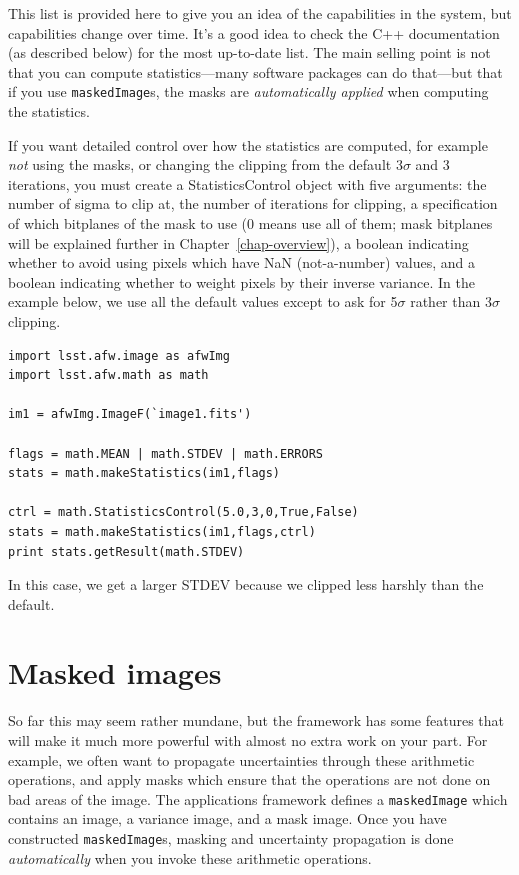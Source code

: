 This list is provided here to give you an idea of the capabilities in
the system, but capabilities change over time.  It's a good idea to
check the C++ documentation (as described below) for the most
up-to-date list.  The main selling point is not that you can compute
statistics---many software packages can do that---but that if you use
\texttt{maskedImage}s, the masks are {\it automatically applied} when
computing the statistics.

If you want detailed control over how the statistics are computed, for
example {\it not} using the masks, or changing the clipping from the
default 3$\sigma$ and 3 iterations, you must create a
StatisticsControl object with five arguments: the number of sigma to
clip at, the number of iterations for clipping, a specification of
which bitplanes of the mask to use (0 means use all of them; mask
bitplanes will be explained further in Chapter~\ref{chap-overview}), a
boolean indicating whether to avoid using pixels which have NaN
(not-a-number) values, and a boolean indicating whether to weight
pixels by their inverse variance.  In the example below, we use all
the default values except to ask for 5$\sigma$ rather than 3$\sigma$
clipping.

\begin{verbatim}
import lsst.afw.image as afwImg
import lsst.afw.math as math

im1 = afwImg.ImageF(`image1.fits')

flags = math.MEAN | math.STDEV | math.ERRORS 
stats = math.makeStatistics(im1,flags)

ctrl = math.StatisticsControl(5.0,3,0,True,False)
stats = math.makeStatistics(im1,flags,ctrl)
print stats.getResult(math.STDEV) 
\end{verbatim}

In this case, we get a larger STDEV because we clipped less harshly
than the default.


\section{Masked images}

So far this may seem rather mundane, but the framework has some
features that will make it much more powerful with almost no extra
work on your part.  For example, we often want to propagate
uncertainties through these arithmetic operations, and apply masks
which ensure that the operations are not done on bad areas of the
image.  The applications framework defines a \texttt{maskedImage}
which contains an image, a variance image, and a mask image.
Once you have constructed \texttt{maskedImage}s, masking and
uncertainty propagation is done {\it automatically} when you invoke
these arithmetic operations.

